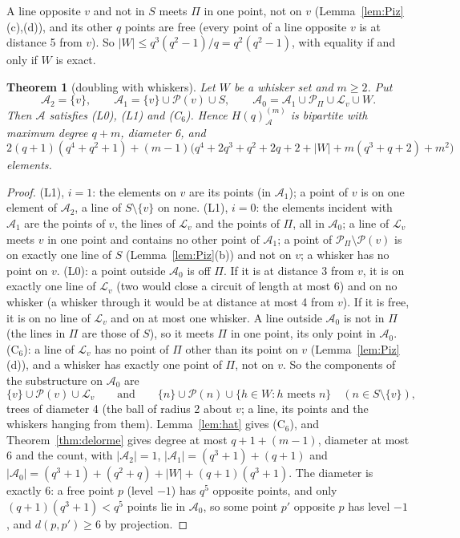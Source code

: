 \documentclass[11pt]{amsart}
\newtheorem{theorem}{Theorem}[section]
\theoremstyle{definition}
\theoremstyle{remark}
\numberwithin{equation}{section}
\newcommand{\cA}{\mathcal A}
\newcommand{\cL}{\mathcal L}
\newcommand{\cP}{\mathcal P}
\begin{document}
A line opposite $v$ and not in $S$ meets $\Pi$ in one point, not on $v$ (Lemma~\ref{lem:Piz}(c),(d)), and its other $q$
points are free (every point of a line opposite $v$ is at distance 5 from $v$). So $|W|\le q^3(q^2-1)/q=q^2(q^2-1)$, with
equality if and only if $W$ is exact.

\begin{theorem}[doubling with whiskers]\label{thm:whiskerdoubling}
Let $W$ be a whisker set and $m\ge2$. Put
\[
\cA_2=\{v\},\qquad \cA_1=\{v\}\cup\cP(v)\cup S,\qquad \cA_0=\cA_1\cup\cP_\Pi\cup\cL_v\cup W .
\]
Then $\cA$ satisfies (L0), (L1) and (C$_6$). Hence $H(q)^{(m)}_\cA$ is bipartite with maximum degree $q+m$, diameter 6,
and
\[
2(q+1)(q^4+q^2+1)+(m-1)\bigl(q^4+2q^3+q^2+2q+2+|W|+m(q^3+q+2)+m^2\bigr)
\]
elements.
\end{theorem}

\begin{proof}
(L1), $i=1$: the elements on $v$ are its points (in $\cA_1$); a point of $v$ is on one element of $\cA_2$, a line of
$S\setminus\{v\}$ on none. (L1), $i=0$: the elements incident with $\cA_1$ are the points of $v$, the lines of $\cL_v$
and the points of $\Pi$, all in $\cA_0$; a line of $\cL_v$ meets $v$ in one point and contains no other point of $\cA_1$;
a point of $\cP_\Pi\setminus\cP(v)$ is on exactly one line of $S$ (Lemma~\ref{lem:Piz}(b)) and not on $v$; a whisker has
no point on $v$. (L0): a point outside $\cA_0$ is off $\Pi$. If it is at distance 3 from $v$, it is on exactly one line of
$\cL_v$ (two would close a circuit of length at most 6) and on no whisker (a whisker through it would be at distance at
most 4 from $v$). If it is free, it is on no line of $\cL_v$ and on at most one whisker. A line outside $\cA_0$ is not in
$\Pi$ (the lines in $\Pi$ are those of $S$), so it meets $\Pi$ in one point, its only point in $\cA_0$. (C$_6$): a line of
$\cL_v$ has no point of $\Pi$ other than its point on $v$ (Lemma~\ref{lem:Piz}(d)), and a whisker has exactly one point of
$\Pi$, not on $v$. So the components of the substructure on $\cA_0$ are
\[
\{v\}\cup\cP(v)\cup\cL_v\qquad\text{and}\qquad \{n\}\cup\cP(n)\cup\{h\in W:h\text{ meets }n\}\quad(n\in S\setminus\{v\}),
\]
trees of diameter 4 (the ball of radius 2 about $v$; a line, its points and the whiskers hanging from them).
Lemma~\ref{lem:hat} gives (C$_6$), and Theorem~\ref{thm:delorme} gives degree at most $q+1+(m-1)$, diameter at most 6 and
the count, with $|\cA_2|=1$, $|\cA_1|=(q^3+1)+(q+1)$ and $|\cA_0|=(q^3+1)+(q^2+q)+|W|+(q+1)(q^3+1)$. The diameter is
exactly 6: a free point $p$ (level $-1$) has $q^5$ opposite points, and only $(q+1)(q^3+1)<q^5$ points lie in $\cA_0$, so
some point $p'$ opposite $p$ has level $-1$, and $d(p,p')\ge6$ by projection.
\end{proof}
\end{document}
